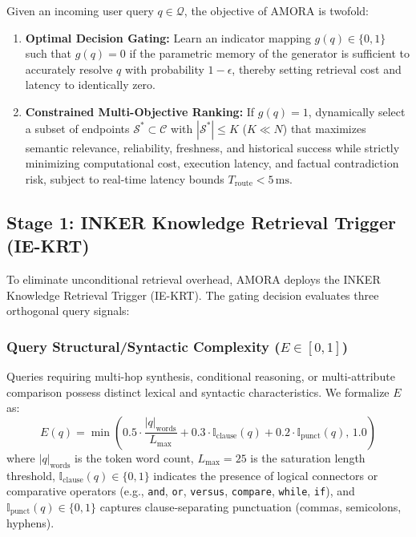Given an incoming user query $q \in \mathcal{Q}$, the objective of AMORA is twofold:
\begin{enumerate}
    \item \textbf{Optimal Decision Gating:} Learn an indicator mapping $g(q) \in \{0, 1\}$ such that $g(q) = 0$ if the parametric memory of the generator is sufficient to accurately resolve $q$ with probability $1 - \epsilon$, thereby setting retrieval cost and latency to identically zero.
    \item \textbf{Constrained Multi-Objective Ranking:} If $g(q) = 1$, dynamically select a subset of endpoints $\mathcal{S}^* \subset \mathcal{C}$ with $|\mathcal{S}^*| \le K$ ($K \ll N$) that maximizes semantic relevance, reliability, freshness, and historical success while strictly minimizing computational cost, execution latency, and factual contradiction risk, subject to real-time latency bounds $T_{\text{route}} < 5\,\text{ms}$.
\end{enumerate}

\subsection{Stage 1: INKER Knowledge Retrieval Trigger (IE-KRT)}
To eliminate unconditional retrieval overhead, AMORA deploys the INKER Knowledge Retrieval Trigger (IE-KRT). The gating decision evaluates three orthogonal query signals:

\subsubsection{Query Structural/Syntactic Complexity ($E \in [0, 1]$)}
Queries requiring multi-hop synthesis, conditional reasoning, or multi-attribute comparison possess distinct lexical and syntactic characteristics. We formalize $E$ as:
\begin{equation}
    E(q) = \min\left( 0.5 \cdot \frac{|q|_{\text{words}}}{L_{\text{max}}} + 0.3 \cdot \mathbb{I}_{\text{clause}}(q) + 0.2 \cdot \mathbb{I}_{\text{punct}}(q), \, 1.0 \right)
    \label{eq:complexity_e}
\end{equation}
where $|q|_{\text{words}}$ is the token word count, $L_{\text{max}} = 25$ is the saturation length threshold, $\mathbb{I}_{\text{clause}}(q) \in \{0, 1\}$ indicates the presence of logical connectors or comparative operators (e.g., \texttt{and}, \texttt{or}, \texttt{versus}, \texttt{compare}, \texttt{while}, \texttt{if}), and $\mathbb{I}_{\text{punct}}(q) \in \{0, 1\}$ captures clause-separating punctuation (commas, semicolons, hyphens).

